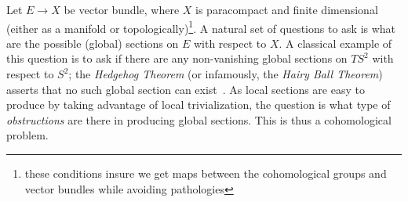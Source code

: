 \documentclass{ut-thesis}
\begin{document}
Let $E \to X$ be vector bundle, where $X$ is paracompact and finite dimensional (either as a manifold or
topologically)\footnote{these conditions insure we get maps between the cohomological groups and vector
bundles while avoiding pathologies}. A natural set of questions to ask is what are the possible (global)
sections on $E$ with respect to $X$. A classical example of this question is to ask if there are any
non-vanishing global sections on $TS^2$ with respect to $S^2$; the \emph{Hedgehog Theorem} (or infamously, the
\emph{Hairy Ball Theorem}) asserts that no such global section can exist~\cite{NateAlgTop}. As local sections
are easy to produce by taking advantage of local trivialization, the question is what type of
\emph{obstructions} are there in producing global sections. This is thus a cohomological problem.

\end{document}
